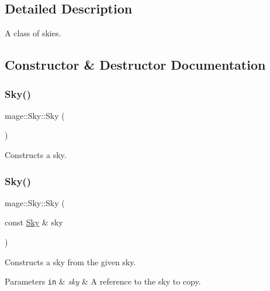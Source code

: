 \subsection{Detailed Description}
A class of skies. 

\subsection{Constructor \& Destructor Documentation}
\hypertarget{classmage_1_1_sky_a4e54074f11814aee89e2554f35e551aa}{}\label{classmage_1_1_sky_a4e54074f11814aee89e2554f35e551aa} 
\subsubsection{\texorpdfstring{Sky()}{Sky()}\hspace{0.1cm}{\footnotesize\ttfamily [1/3]}}
{\footnotesize\ttfamily mage\+::\+Sky\+::\+Sky (\begin{DoxyParamCaption}{ }\end{DoxyParamCaption})\hspace{0.3cm}{\ttfamily [default]}}

Constructs a sky. \hypertarget{classmage_1_1_sky_ab041650afed6344cd7874308def5c35c}{}\label{classmage_1_1_sky_ab041650afed6344cd7874308def5c35c} 
\subsubsection{\texorpdfstring{Sky()}{Sky()}\hspace{0.1cm}{\footnotesize\ttfamily [2/3]}}
{\footnotesize\ttfamily mage\+::\+Sky\+::\+Sky (\begin{DoxyParamCaption}\item[{const \hyperlink{classmage_1_1_sky}{Sky} \&}]{sky }\end{DoxyParamCaption})\hspace{0.3cm}{\ttfamily [default]}}

Constructs a sky from the given sky.


\begin{DoxyParams}[1]{Parameters}
\mbox{\tt in}  & {\em sky} & A reference to the sky to copy. \\
\hline
\end{DoxyParams}
\hypertarget{classmage_1_1_sky_a2b9a9737f82d1e390c2f50acc2c686e7}{}\label{classmage_1_1_sky_a2b9a9737f82d1e390c2f50acc2c686e7} 
